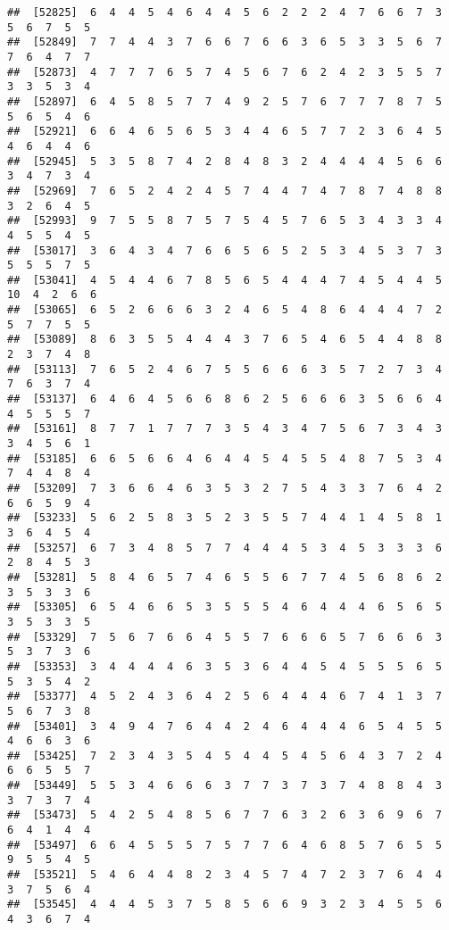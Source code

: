 \documentclass[
]{book}
\begin{document}
\begin{verbatim}
##  [52825]  6  4  4  5  4  6  4  4  5  6  2  2  2  4  7  6  6  7  3  5  6  7  5  5
##  [52849]  7  7  4  4  3  7  6  6  7  6  6  3  6  5  3  3  5  6  7  7  6  4  7  7
##  [52873]  4  7  7  7  6  5  7  4  5  6  7  6  2  4  2  3  5  5  7  3  3  5  3  4
##  [52897]  6  4  5  8  5  7  7  4  9  2  5  7  6  7  7  7  8  7  5  5  6  5  4  6
##  [52921]  6  6  4  6  5  6  5  3  4  4  6  5  7  7  2  3  6  4  5  4  6  4  4  6
##  [52945]  5  3  5  8  7  4  2  8  4  8  3  2  4  4  4  4  5  6  6  3  4  7  3  4
##  [52969]  7  6  5  2  4  2  4  5  7  4  4  7  4  7  8  7  4  8  8  3  2  6  4  5
##  [52993]  9  7  5  5  8  7  5  7  5  4  5  7  6  5  3  4  3  3  4  4  5  5  4  5
##  [53017]  3  6  4  3  4  7  6  6  5  6  5  2  5  3  4  5  3  7  3  5  5  5  7  5
##  [53041]  4  5  4  4  6  7  8  5  6  5  4  4  4  7  4  5  4  4  5 10  4  2  6  6
##  [53065]  6  5  2  6  6  6  3  2  4  6  5  4  8  6  4  4  4  7  2  5  7  7  5  5
##  [53089]  8  6  3  5  5  4  4  4  3  7  6  5  4  6  5  4  4  8  8  2  3  7  4  8
##  [53113]  7  6  5  2  4  6  7  5  5  6  6  6  3  5  7  2  7  3  4  7  6  3  7  4
##  [53137]  6  4  6  4  5  6  6  8  6  2  5  6  6  6  3  5  6  6  4  4  5  5  5  7
##  [53161]  8  7  7  1  7  7  7  3  5  4  3  4  7  5  6  7  3  4  3  3  4  5  6  1
##  [53185]  6  6  5  6  6  4  6  4  4  5  4  5  5  4  8  7  5  3  4  7  4  4  8  4
##  [53209]  7  3  6  6  4  6  3  5  3  2  7  5  4  3  3  7  6  4  2  6  6  5  9  4
##  [53233]  5  6  2  5  8  3  5  2  3  5  5  7  4  4  1  4  5  8  1  3  6  4  5  4
##  [53257]  6  7  3  4  8  5  7  7  4  4  4  5  3  4  5  3  3  3  6  2  8  4  5  3
##  [53281]  5  8  4  6  5  7  4  6  5  5  6  7  7  4  5  6  8  6  2  3  5  3  3  6
##  [53305]  6  5  4  6  6  5  3  5  5  5  4  6  4  4  4  6  5  6  5  3  5  3  3  5
##  [53329]  7  5  6  7  6  6  4  5  5  7  6  6  6  5  7  6  6  6  3  5  3  7  3  6
##  [53353]  3  4  4  4  4  6  3  5  3  6  4  4  5  4  5  5  5  6  5  5  3  5  4  2
##  [53377]  4  5  2  4  3  6  4  2  5  6  4  4  4  6  7  4  1  3  7  5  6  7  3  8
##  [53401]  3  4  9  4  7  6  4  4  2  4  6  4  4  4  6  5  4  5  5  4  6  6  3  6
##  [53425]  7  2  3  4  3  5  4  5  4  4  5  4  5  6  4  3  7  2  4  6  6  5  5  7
##  [53449]  5  5  3  4  6  6  6  3  7  7  3  7  3  7  4  8  8  4  3  3  7  3  7  4
##  [53473]  5  4  2  5  4  8  5  6  7  7  6  3  2  6  3  6  9  6  7  6  4  1  4  4
##  [53497]  6  6  4  5  5  5  7  5  7  7  6  4  6  8  5  7  6  5  5  9  5  5  4  5
##  [53521]  5  4  6  4  4  8  2  3  4  5  7  4  7  2  3  7  6  4  4  3  7  5  6  4
##  [53545]  4  4  4  5  3  7  5  8  5  6  6  9  3  2  3  4  5  5  6  4  3  6  7  4

\end{verbatim}
\end{document}
